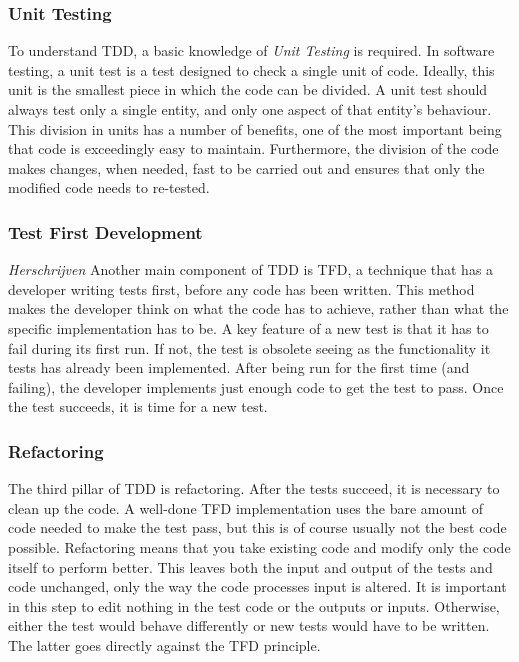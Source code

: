 \documentclass[11pt,british]{article}
\begin{document}
\subsubsection{Unit Testing}
To understand \gls{TDD}, a basic knowledge of \emph{Unit Testing} is required. In software testing, a unit test is a test designed to check a single unit of code. Ideally, this unit is the smallest piece in which the code can be divided. A unit test should always test only a single entity, and only one aspect of that entity's behaviour. This division in units has a number of benefits, one of the most important being that code is exceedingly easy to maintain. Furthermore, the division of the code makes changes, when needed, fast to be carried out and ensures that only the modified code needs to re-tested.

\subsubsection{Test First Development}
\emph{\color{red}Herschrijven}
Another main component of \gls{TDD} is \gls{TFD}, a technique that has a developer writing tests first, before any code has been written. This method makes the developer think on what the code has to achieve, rather than what the specific implementation has to be. A key feature of a new test is that it has to fail during its first run. If not, the test is obsolete seeing as the functionality it tests has already been implemented. After being run for the first time (and failing), the developer implements just enough code to get the test to pass. Once the test succeeds, it is time for a new test.

\subsubsection{Refactoring}
The third pillar of TDD is refactoring. After the tests succeed, it is necessary to clean up the code. A well-done \gls{TFD} implementation uses the bare amount of code needed to make the test pass, but this is of course usually not the best code possible. Refactoring means that you take existing code and modify only the code itself to perform better. This leaves both the input and output of the tests and code unchanged, only the way the code processes input is altered. It is important in this step to edit nothing in the test code or the outputs or inputs. Otherwise, either the test would behave differently or new tests would have to be written. The latter goes directly against the \gls{TFD} principle.
\end{document}
